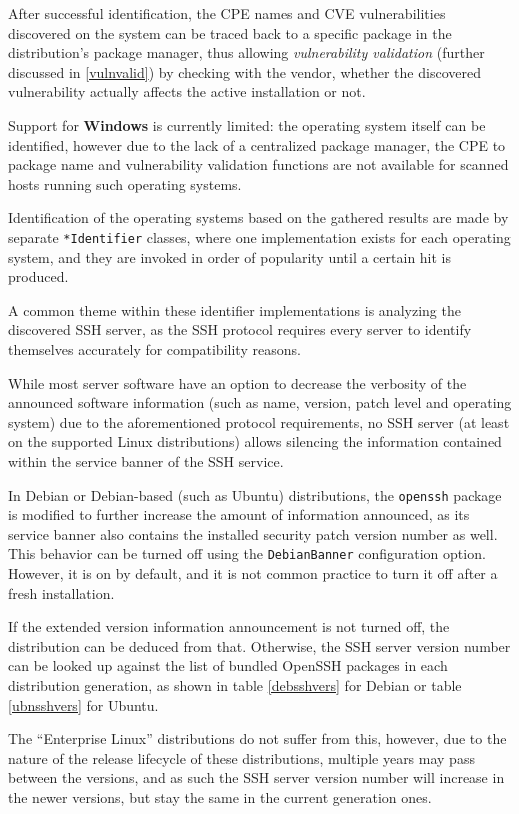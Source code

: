 \documentclass[a4paper,12pt]{article}
\begin{document}
	After successful identification, the CPE names and CVE vulnerabilities discovered on the system can be traced back to a specific package in the distribution's package manager, thus allowing \textit{vulnerability validation} (further discussed in \ref{vulnvalid}) by checking with the vendor, whether the discovered vulnerability actually affects the active installation or not.
	
	Support for \textbf{Windows} is currently limited: the operating system itself can be identified, however due to the lack of a centralized package manager, the CPE to package name and vulnerability validation functions are not available for scanned hosts running such operating systems.
	
	Identification of the operating systems based on the gathered results are made by separate \texttt{*Identifier} classes, where one implementation exists for each operating system, and they are invoked in order of popularity until a certain hit is produced.
	
	A common theme within these identifier implementations is analyzing the discovered SSH server, as the SSH protocol requires every server to identify themselves accurately for compatibility reasons.
	
	While most server software have an option to decrease the verbosity of the announced software information (such as name, version, patch level and operating system) due to the aforementioned protocol requirements, no SSH server (at least on the supported Linux distributions) allows silencing the information contained within the service banner of the SSH service.
	
	In Debian or Debian-based (such as Ubuntu) distributions, the \texttt{openssh} package is modified to further increase the amount of information announced, as its service banner also contains the installed security patch version number as well. This behavior can be turned off using the \texttt{DebianBanner} configuration option. However, it is on by default, and it is not common practice to turn it off after a fresh installation.
	
	If the extended version information announcement is not turned off, the distribution can be deduced from that. Otherwise, the SSH server version number can be looked up against the list of bundled OpenSSH packages in each distribution generation, as shown in table \ref{debsshvers} for Debian or table \ref{ubnsshvers} for Ubuntu.
	
	The ``Enterprise Linux'' distributions do not suffer from this, however, due to the nature of the release lifecycle of these distributions, multiple years may pass between the versions, and as such the SSH server version number will increase in the newer versions, but stay the same in the current generation ones.
	
\end{document}
